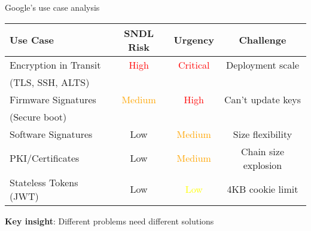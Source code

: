 \documentclass[aspectratio=169, lualatex, handout]{beamer}
\begin{document}
\begin{frame}{Google's use case analysis}
	\begin{center}
		\begin{tabular}{|l|c|c|c|}
			\hline
			\textbf{Use Case}      & \textbf{SNDL Risk}              & \textbf{Urgency}           & \textbf{Challenge}   \\
			\hline
			\hline
			Encryption in Transit  & \textcolor{red}{High}           & \textcolor{red}{Critical}  & Deployment scale     \\
			(TLS, SSH, ALTS)       &                                 &                            &                      \\
			\hline
			Firmware Signatures    & \textcolor{orange}{Medium}      & \textcolor{red}{High}      & Can't update keys    \\
			(Secure boot)          &                                 &                            &                      \\
			\hline
			Software Signatures    & \textcolor{green!70!black}{Low} & \textcolor{orange}{Medium} & Size flexibility     \\
			\hline
			PKI/Certificates       & \textcolor{green!70!black}{Low} & \textcolor{orange}{Medium} & Chain size explosion \\
			\hline
			Stateless Tokens (JWT) & \textcolor{green!70!black}{Low} & \textcolor{yellow}{Low}    & 4KB cookie limit     \\
			\hline
		\end{tabular}
	\end{center}
	\vspace{3mm}
	\textbf{Key insight}: Different problems need different solutions
\end{frame}
\end{document}
